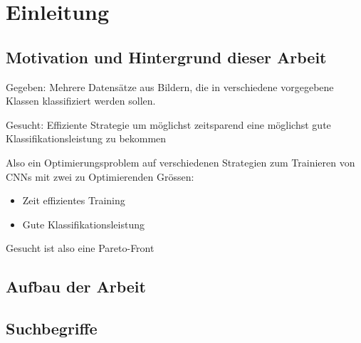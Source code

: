 \chapter{Einleitung}
\label{sec:EinleitungGesamt}

\section{Motivation und Hintergrund dieser Arbeit}
Gegeben: Mehrere Datensätze aus Bildern, die in verschiedene vorgegebene Klassen klassifiziert werden sollen.

Gesucht: Effiziente Strategie um möglichst zeitsparend eine möglichst gute Klassifikationsleistung zu bekommen

Also ein Optimierungsproblem auf verschiedenen Strategien zum Trainieren von CNNs mit zwei zu Optimierenden Grössen:
\begin{itemize}
 \item Zeit effizientes Training
 \item Gute Klassifikationsleistung
\end{itemize}

Gesucht ist also eine Pareto-Front 

\section{Aufbau der Arbeit}


\section{Suchbegriffe}
